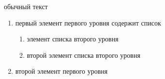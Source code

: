 \tableofcontents %

обычный текст

\begin{enumerate} 
    \item первый элемент первого уровня содержит список 
      \begin{enumerate} 
          \item элемент списка второго уровня
          \item второй элемент списка второго уровня
      \end{enumerate} 
    \item  второй элемент первого уровня
  \end{enumerate}


\clearpage